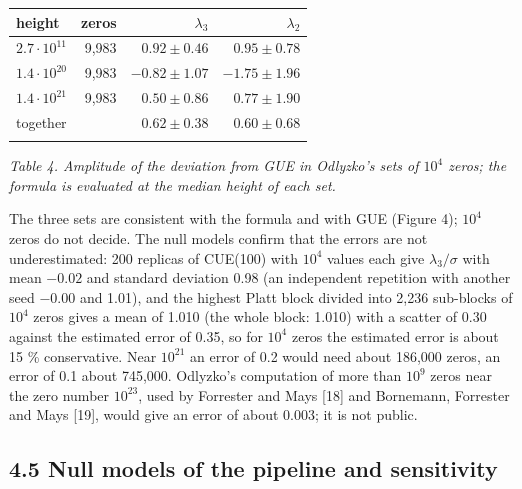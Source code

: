 \documentclass[
  10pt,
]{article}
\begin{document}
{\small\begin{longtable}[]{@{}lrrr@{}}
\toprule\noalign{}
height & zeros & \(\lambda_3\) & \(\lambda_2\) \\
\midrule\noalign{}
\endhead
\bottomrule\noalign{}
\endlastfoot
\(2.7\cdot10^{11}\) & 9,983 & \(0.92 \pm 0.46\) & \(0.95 \pm 0.78\) \\ \addlinespace[2pt]
\(1.4\cdot10^{20}\) & 9,983 & \(-0.82 \pm 1.07\) & \(-1.75 \pm 1.96\) \\ \addlinespace[2pt]
\(1.4\cdot10^{21}\) & 9,983 & \(0.50 \pm 0.86\) & \(0.77 \pm 1.90\) \\ \addlinespace[2pt]
together & & \(0.62 \pm 0.38\) & \(0.60 \pm 0.68\) \\ \addlinespace[2pt]
\end{longtable}}

\emph{Table 4. Amplitude of the deviation from GUE in Odlyzko's sets of
\(10^4\) zeros; the formula is evaluated at the median height of each
set.}

The three sets are consistent with the formula and with GUE (Figure 4);
\(10^4\) zeros do not decide. The null models confirm that the errors
are not underestimated: 200 replicas of CUE(100) with \(10^4\) values
each give \(\lambda_3/\sigma\) with mean \(-0.02\) and standard
deviation 0.98 (an independent repetition with another seed \(-0.00\)
and 1.01), and the highest Platt block divided into 2,236 sub-blocks of
\(10^4\) zeros gives a mean of 1.010 (the whole block: 1.010) with a
scatter of 0.30 against the estimated error of 0.35, so for \(10^4\)
zeros the estimated error is about 15 \% conservative. Near \(10^{21}\)
an error of 0.2 would need about 186,000 zeros, an error of 0.1 about
745,000. Odlyzko's computation of more than \(10^9\) zeros near the zero
number \(10^{23}\), used by Forrester and Mays {[}18{]} and Bornemann,
Forrester and Mays {[}19{]}, would give an error of about 0.003; it is
not public.

\hypertarget{null-models-of-the-pipeline-and-sensitivity}{%
\subsection{4.5 Null models of the pipeline and
sensitivity}\label{null-models-of-the-pipeline-and-sensitivity}}
\end{document}
